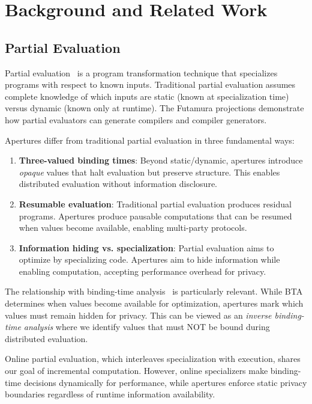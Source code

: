 \documentclass[12pt]{article}
\begin{document}
\section{Background and Related Work}

\subsection{Partial Evaluation}

Partial evaluation~\cite{jones1993partial} is a program transformation technique that specializes programs with respect to known inputs. Traditional partial evaluation assumes complete knowledge of which inputs are static (known at specialization time) versus dynamic (known only at runtime). The Futamura projections demonstrate how partial evaluators can generate compilers and compiler generators.

Apertures differ from traditional partial evaluation in three fundamental ways:
\begin{enumerate}
    \item \textbf{Three-valued binding times}: Beyond static/dynamic, apertures introduce \textit{opaque} values that halt evaluation but preserve structure. This enables distributed evaluation without information disclosure.
    
    \item \textbf{Resumable evaluation}: Traditional partial evaluation produces residual programs. Apertures produce pausable computations that can be resumed when values become available, enabling multi-party protocols.
    
    \item \textbf{Information hiding vs. specialization}: Partial evaluation aims to optimize by specializing code. Apertures aim to hide information while enabling computation, accepting performance overhead for privacy.
\end{enumerate}

The relationship with binding-time analysis~\cite{nielson1992two} is particularly relevant. While BTA determines when values become available for optimization, apertures mark which values must remain hidden for privacy. This can be viewed as an \textit{inverse binding-time analysis} where we identify values that must NOT be bound during distributed evaluation.

Online partial evaluation, which interleaves specialization with execution, shares our goal of incremental computation. However, online specializers make binding-time decisions dynamically for performance, while apertures enforce static privacy boundaries regardless of runtime information availability.
\end{document}
